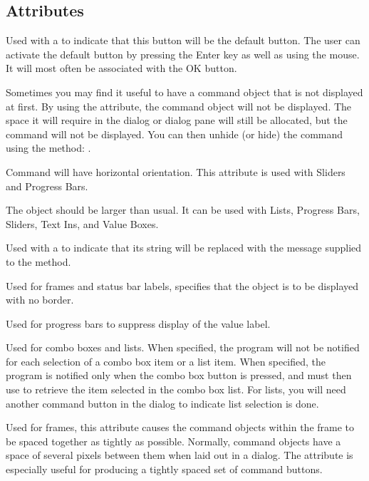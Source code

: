 \subsection* {Attributes}

 Used with a  to
indicate that this button will be the default button. The user
can activate the default button by pressing the Enter key as well
as using the mouse. It will most often be associated with the OK
button.

 Sometimes you may find it useful to have a
command object that is not displayed at first. By using the
 attribute, the command object will not be
displayed. The space it will require in the dialog or dialog pane
will still be allocated, but the command will not be displayed.
You can then unhide (or hide) the command using the 
method: .

 Command will have horizontal orientation.
This attribute is used with Sliders and Progress Bars.

 The object should be larger than usual. It can
be used with Lists, Progress Bars, Sliders, Text Ins, and Value
Boxes.

 Used with a  to indicate that
its string will be replaced with the message supplied to the
 method.

 Used for frames and status bar labels,
 specifies that the object is to be displayed
with no border.

 Used for progress bars to suppress display of
the value label.

 Used for combo boxes and lists. When
specified, the program will not be notified for each selection of
a combo box item or a list item. When specified, the program is
notified only when the combo box button is pressed, and must then
use  to retrieve the item selected in the combo
box list. For lists, you will need another command button in the
dialog to indicate list selection is done.

 Used for frames, this attribute causes the
command objects within the frame to be spaced together as tightly
as possible. Normally, command objects have a space of several
pixels between them when laid out in a dialog. The 
attribute is especially useful for producing a tightly spaced
set of command buttons.

